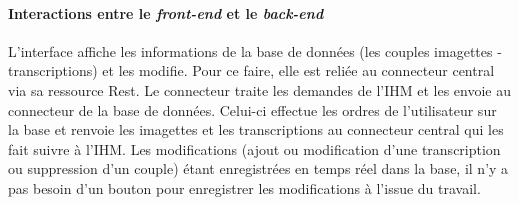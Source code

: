 \paragraph{Interactions entre le \textit{front-end} et le \textit{back-end}}

L’interface affiche les informations de la base de données (les couples imagettes - transcriptions) et les modifie. Pour ce faire, elle est reliée au connecteur central via sa ressource Rest. Le connecteur traite les demandes de l’IHM et les envoie au connecteur de la base de données. Celui-ci effectue les ordres de l’utilisateur sur la base et renvoie les imagettes et les transcriptions au connecteur central qui les fait suivre à l’IHM. Les modifications (ajout ou modification d’une transcription ou suppression d’un couple) étant enregistrées en temps réel dans la base, il n’y a pas besoin d’un bouton pour enregistrer les modifications à l’issue du travail.
